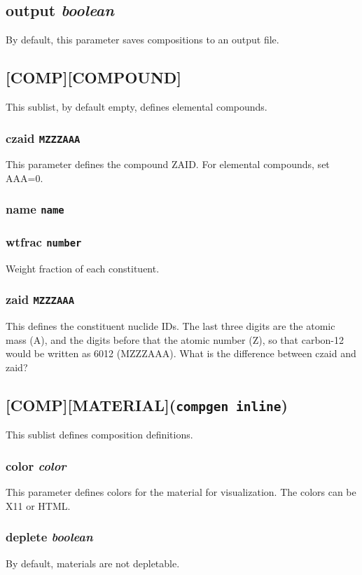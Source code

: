 \documentclass[10pt]{article}
\begin{document}
\subsection{output \textit{boolean}}
By default, this parameter saves compositions to an output file.

\subsection{[COMP][COMPOUND]}
This sublist, by default empty, defines elemental compounds. 

\subsubsection{czaid \texttt{MZZZAAA}}
This parameter defines the compound ZAID. For elemental compounds, set AAA=0. 

\subsubsection{name \texttt{name}}

\subsubsection{wtfrac \texttt{number}}
Weight fraction of each constituent. 

\subsubsection{zaid \texttt{MZZZAAA}}
This defines the constituent nuclide IDs. The last three digits are the atomic mass (A), and the digits before that the atomic number (Z), so that carbon-12 would be written as 6012 (MZZZAAA). What is the difference between czaid and zaid? 

\subsection{[COMP][MATERIAL]\quad\quad\quad(\texttt{compgen inline})}
This sublist defines composition definitions.

\subsubsection{color \textit{color}}
This parameter defines colors for the material for visualization. The colors can be X11 or HTML. 

\subsubsection{deplete \textit{boolean}}
By default, materials are not depletable. 
\end{document}
